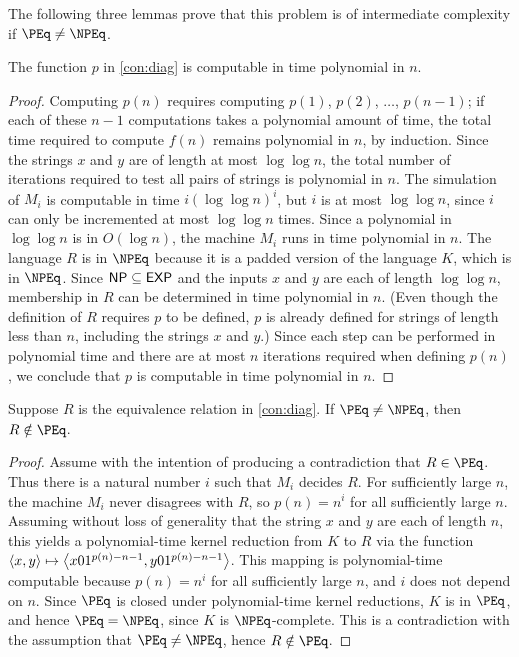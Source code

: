 The following three lemmas prove that this problem is of intermediate complexity if $\PEq \neq \NPEq$.

\begin{lemma}
  The function $p$ in \autoref{con:diag} is computable in time polynomial in $n$.
\end{lemma}
\begin{proof}
  Computing $p(n)$ requires computing $p(1)$, $p(2)$, $\dotsc$, $p(n - 1)$; if each of these $n - 1$ computations takes a polynomial amount of time, the total time required to compute $f(n)$ remains polynomial in $n$, by induction.
  Since the strings $x$ and $y$ are of length at most $\log \log n$, the total number of iterations required to test all pairs of strings is polynomial in $n$.
  The simulation of $M_i$ is computable in time $i (\log \log n)^i$, but $i$ is at most $\log \log n$, since $i$ can only be incremented at most $\log \log n$ times.
  Since a polynomial in $\log \log n$ is in $O(\log n)$, the machine $M_i$ runs in time polynomial in $n$.
  The language $R$ is in $\NPEq$ because it is a padded version of the language $K$, which is in $\NPEq$.
  Since ${\mathsf{NP}} \subseteq {\ensuremath{\mathsf{EXP}}}$ and the inputs $x$ and $y$ are each of length $\log \log n$, membership in $R$ can be determined in time polynomial in $n$.
  (Even though the definition of $R$ requires $p$ to be defined, $p$ is already defined for strings of length less than $n$, including the strings $x$ and $y$.)
  Since each step can be performed in polynomial time and there are at most $n$ iterations required when defining $p(n)$, we conclude that $p$ is computable in time polynomial in $n$.
\end{proof}

\begin{lemma}
  Suppose $R$ is the equivalence relation in \autoref{con:diag}.
  If $\PEq \neq \NPEq$, then $R \notin \PEq$.
\end{lemma}
\begin{proof}
  Assume with the intention of producing a contradiction that $R \in \PEq$.
  Thus there is a natural number $i$ such that $M_i$ decides $R$.
  For sufficiently large $n$, the machine $M_i$ never disagrees with $R$, so $p(n) = n^i$ for all sufficiently large $n$.
  Assuming without loss of generality that the string $x$ and $y$ are each of length $n$, this yields a polynomial-time kernel reduction from $K$ to $R$ via the function $\langle x,y\rangle \mapsto \left\langle x 0 1^{p(n) - n - 1}, y 0 1^{p(n) - n - 1}\right\rangle$.
  This mapping is polynomial-time computable because $p(n) = n^i$ for all sufficiently large $n$, and $i$ does not depend on $n$.
  Since $\PEq$ is closed under polynomial-time kernel reductions, $K$ is in $\PEq$, and hence $\PEq = \NPEq$, since $K$ is $\NPEq$-complete.
  This is a contradiction with the assumption that $\PEq \neq \NPEq$, hence $R \notin \PEq$.
\end{proof}

